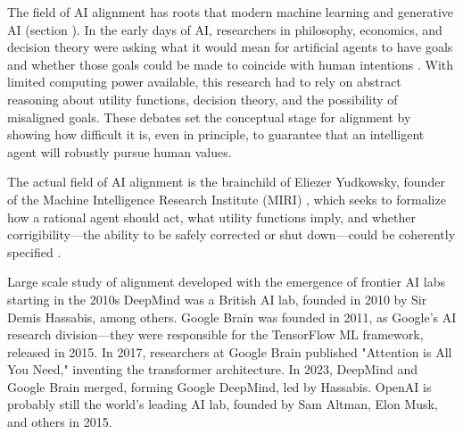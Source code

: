 

The field of AI alignment has roots that modern machine learning and generative AI (section ). In the early days of AI, researchers in philosophy, economics, and decision theory were asking what it would mean for artificial agents to have goals and whether those goals could be made to coincide with human intentions \cite{von1944games,omohundro2008drives,bostrom2014superintelligence}. With limited computing power available, this research had to rely on abstract reasoning about utility functions, decision theory, and the possibility of misaligned goals.  These debates set the conceptual stage for alignment by showing how difficult it is, even in principle, to guarantee that an intelligent agent will robustly pursue human values.

The actual field of AI alignment is the brainchild of Eliezer Yudkowsky, founder of the Machine Intelligence Research Institute (MIRI)
\cite{yudkowsky2008factor}, which seeks to formalize how a rational agent should act, what utility functions imply, and whether corrigibility---the ability to be safely corrected or shut down---could be coherently specified \cite{soares2015corrigibility}. 

Large scale study of alignment developed with the emergence of frontier AI labs starting in the 2010s  DeepMind was a British AI lab, founded in 2010 by Sir Demis Hassabis, among others. Google Brain was founded in 2011, as Google's AI research division—they were responsible for the TensorFlow ML framework, released in 2015. In 2017, researchers at Google Brain published "Attention is All You Need," inventing the transformer architecture. In 2023, DeepMind and Google Brain merged, forming Google DeepMind, led by Hassabis. OpenAI is probably still the world's leading AI lab, founded by Sam Altman, Elon Musk, and others in 2015. 

